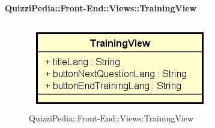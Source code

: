\paragraph{QuizziPedia::Front-End::Views::TrainingView}
\begin{figure} [ht]
	\centering
	\includegraphics[scale=0.45]{UML/Classi/Front-End/QuizziPedia_Front-end_TrainingView.png}
	\caption{QuizziPedia::Front-End::Views:TrainingView}
\end{figure} \FloatBarrier
